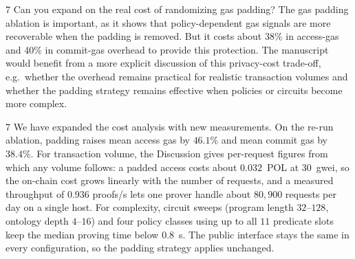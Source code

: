 \begin{reviewcomment}{7}
	Can you expand on the real cost of randomizing gas padding?
	The gas padding ablation is important, as it shows that policy-dependent gas signals are more recoverable when the padding is removed.
	But it costs about 38\% in access-gas and 40\% in commit-gas overhead to provide this protection.
	The manuscript would benefit from a more explicit discussion of this privacy-cost trade-off, e.g.\ whether the overhead remains practical for realistic transaction volumes and whether the padding strategy remains effective when policies or circuits become more complex.
\end{reviewcomment}

\begin{reviewresponse}{7}
	We have expanded the cost analysis with new measurements.
	On the re-run ablation, padding raises mean access gas by $46.1\%$ and mean commit gas by $38.4\%$.
	For transaction volume, the Discussion gives per-request figures from which any volume follows: a padded access costs about $0.032$~POL at 30~gwei, so the on-chain cost grows linearly with the number of requests, and a measured throughput of $0.936$ proofs/s lets one prover handle about $80{,}900$ requests per day on a single host.
	For complexity, circuit sweeps (program length $32$--$128$, ontology depth $4$--$16$) and four policy classes using up to all $11$ predicate slots keep the median proving time below $0.8$~s.
	The public interface stays the same in every configuration, so the padding strategy applies unchanged.

\end{reviewresponse}
